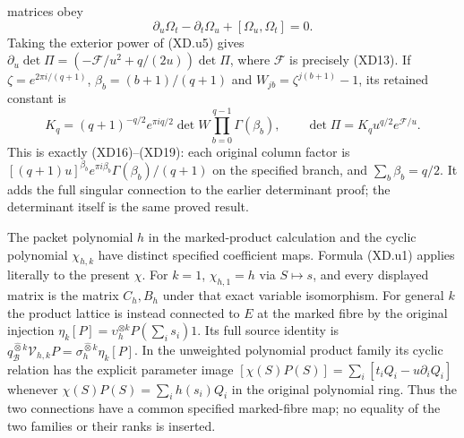 matrices obey
\[
 \partial_u\Omega_t-\partial_t\Omega_u+
                    [\Omega_u,\Omega_t]=0.           \tag{XD.u6}
\]
Taking the exterior power of (XD.u5) gives
$\partial_u\det\Pi=(-\mathcal F/u^2+q/(2u))\det\Pi$,
where $\mathcal F$ is precisely (XD13).  If
$\zeta=e^{2\pi i/(q+1)}$, $\beta_b=(b+1)/(q+1)$ and
$W_{jb}=\zeta^{j(b+1)}-1$, its retained constant is
\[
 K_q=(q+1)^{-q/2}e^{\pi i q/2}
          \det W\prod_{b=0}^{q-1}\Gamma(\beta_b),\qquad
 \det\Pi=K_q u^{q/2}e^{\mathcal F/u}.                \tag{XD.u7}
\]
This is exactly (XD16)--(XD19): each original column factor is
$[(q+1)u]^{\beta_b}e^{\pi i\beta_b}\Gamma(\beta_b)/(q+1)$
on the specified branch, and $\sum_b\beta_b=q/2$.
It adds the full singular connection to the earlier determinant proof;
the determinant itself is the same proved result.

The packet polynomial $h$ in the marked-product calculation and the
cyclic polynomial $\chi_{h,k}$ have distinct specified coefficient
maps.  Formula (XD.u1) applies literally to the present $\chi$.
For $k=1$, $\chi_{h,1}=h$ via $S\mapsto s$, and every displayed
matrix is the matrix $C_h,B_h$ under that exact variable isomorphism.
For general $k$ the product lattice is instead connected to $E$
at the marked fibre by the original injection
$\eta_k[P]=\upsilon_h^{\otimes k}P(\sum_i s_i)1$.
Its full source identity is
$q_{\mathscr B}^{\widehat\otimes k}\mathcal V_{h,k}P
=\sigma_h^{\widehat\otimes k}\eta_k[P]$.
In the unweighted polynomial product family its cyclic relation has
the explicit parameter image
$[\chi(S)P(S)]=\sum_i[t_iQ_i-u\partial_iQ_i]$ whenever
$\chi(S)P(S)=\sum_i h(s_i)Q_i$ in the original polynomial ring.
Thus the two connections have a common specified marked-fibre map;
no equality of the two families or their ranks is inserted.

